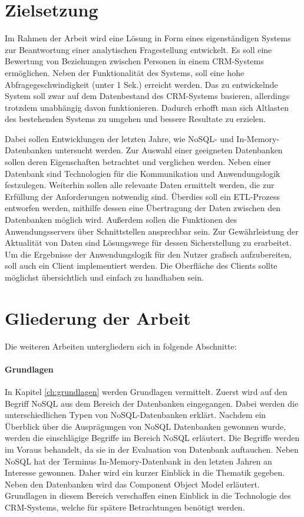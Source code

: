 \section{Zielsetzung}
\label{ch:Einfuehrung:sec:Zielsetzung}

Im Rahmen der Arbeit wird eine Lösung in Form eines eigenständigen Systems zur Beantwortung einer analytischen Fragestellung entwickelt. Es soll eine Bewertung von Beziehungen zwischen Personen in einem CRM-Systems ermöglichen. Neben der Funktionalität des Systems, soll eine hohe Abfragegeschwindigkeit (unter 1 Sek.) erreicht werden. Das zu entwickelnde System soll zwar auf dem Datenbestand des CRM-Systems basieren, allerdings trotzdem unabhängig davon funktionieren. Dadurch erhofft man sich Altlasten des bestehenden Systems zu umgehen und bessere Resultate zu erzielen. 

Dabei sollen Entwicklungen der letzten Jahre, wie NoSQL- und In-Memory-Datenbanken  untersucht werden. Zur Auswahl einer geeigneten Datenbanken sollen deren Eigenschaften betrachtet und verglichen werden. Neben einer Datenbank sind Technologien für die Kommunikation und Anwendungslogik festzulegen. Weiterhin sollen alle relevante Daten ermittelt werden, die zur Erfüllung der Anforderungen notwendig sind. Überdies soll ein ETL-Prozess entworfen werden, mithilfe dessen eine Übertragung der Daten zwischen den Datenbanken möglich wird. Außerdem sollen die Funktionen des Anwendungsservers über Schnittstellen ansprechbar sein. Zur Gewährleistung der Aktualität von Daten sind Lösungswege für dessen Sicherstellung zu erarbeitet. Um die Ergebnisse der Anwendungslogik für den Nutzer grafisch aufzubereiten, soll auch ein Client implementiert werden. Die Oberfläche des Clients sollte möglichst übersichtlich und einfach zu handhaben sein.

\section{Gliederung der Arbeit}
\label{ch:Einfuehrung:sec:Gliederung}

Die weiteren Arbeiten untergliedern sich in folgende Abschnitte: 
 
\paragraph{Grundlagen} In Kapitel \ref{ch:grundlagen} werden Grundlagen vermittelt. Zuerst wird auf den Begriff NoSQL aus dem Bereich der Datenbanken eingegangen. Dabei werden die unterschiedlichen Typen von NoSQL-Datenbanken erklärt. Nachdem ein Überblick über die Ausprägungen von NoSQL Datenbanken gewonnen wurde, werden die einschlägige Begriffe im Bereich NoSQL erläutert. Die Begriffe werden im Voraus behandelt, da sie in der Evaluation von Datenbank auftauchen. Neben NoSQL hat der Terminus In-Memory-Datenbank in den letzten Jahren an Interesse gewonnen. Daher wird ein kurzer Einblick in die Thematik gegeben. Neben den Datenbanken wird das Component Object Model erläutert. Grundlagen in diesem Bereich verschaffen einen Einblick in die Technologie des CRM-Systems, welche für spätere Betrachtungen benötigt werden. 

